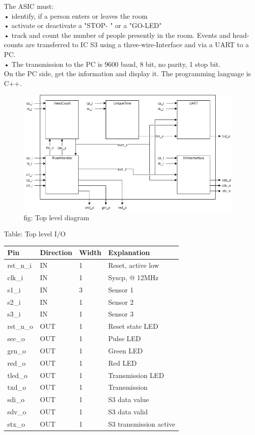 \documentclass[12pt,a4 paper] {article}
\begin{document}
The ASIC must:\\
• identify, if a person enters or leaves the room\\
• activate or deactivate a "STOP- " or a "GO-LED"\\
• track and count the number of people presently in the room. Events and head-counts are transferred to IC S3 using a three-wire-Interface and via a UART to a PC. \\
• The transmission to the PC is 9600 baud, 8 bit, no parity, 1 stop bit. \\
On the PC side, get the information and display it. The programming language is
C++.\\
\begin{figure}[h]
	\centering	
	\includegraphics[scale=0.3]{../png/top.png}
	fig: Top level diagram\\
\end{figure}
\newpage
 Table: Top level I/O \\
\begin{center}
	\begin{tabular}{ |p{2cm}|p{2cm}|p{1cm}|p{5cm}| } 
	\hline
	Pin & Direction & Width & Explanation \\
	\hline
	rst\_n\_i  & IN & 1 & Reset, active low  \\
	\hline
	clk\_i  & IN & 1 & Syscp, @ 12MHz \\
	\hline
	s1\_i & IN & 3 & Sensor 1 \\
	\hline
	s2\_i  & IN & 1 & Sensor 2 \\
	\hline
	s3\_i  & IN & 1 & Sensor 3 \\
	\hline
	rst\_n\_o & OUT & 1 & Reset state LED  \\
	\hline
	sec\_o  & OUT & 1 & Pulse LED \\
	\hline
	grn\_o  & OUT & 1 & Green LED  \\
	\hline
	 red\_o & OUT & 1 & Red LED\\
	\hline
	tled\_o & OUT & 1 & Transmission LED  \\
	\hline
	txd\_o & OUT & 1 & Transmission \\
	\hline
	 sdi\_o  & OUT & 1 & S3 data value  \\
	\hline
	 sdv\_o & OUT &  1& S3 data valid \\
	\hline
	stx\_o  & OUT & 1 & S3 transmission active  \\
	\hline
	
	\end{tabular}
\end{center}
\newpage
\end{document}
